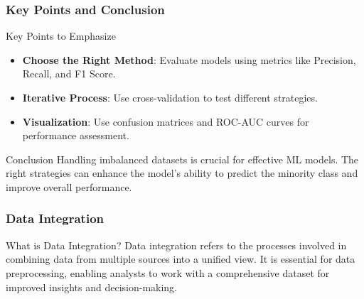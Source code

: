 \documentclass[aspectratio=169]{beamer}
\begin{document}
\begin{frame}[fragile]
    \frametitle{Key Points and Conclusion}
    \begin{block}{Key Points to Emphasize}
        \begin{itemize}
            \item \textbf{Choose the Right Method}: Evaluate models using metrics like Precision, Recall, and F1 Score.
            \item \textbf{Iterative Process}: Use cross-validation to test different strategies.
            \item \textbf{Visualization}: Use confusion matrices and ROC-AUC curves for performance assessment.
        \end{itemize}
    \end{block}
    
    \begin{block}{Conclusion}
        Handling imbalanced datasets is crucial for effective ML models. The right strategies can enhance the model's ability to predict the minority class and improve overall performance.
    \end{block}
\end{frame}

\begin{frame}[fragile]
    \frametitle{Data Integration}
    \begin{block}{What is Data Integration?}
        Data integration refers to the processes involved in combining data from multiple sources into a unified view. It is essential for data preprocessing, enabling analysts to work with a comprehensive dataset for improved insights and decision-making.
    \end{block}
\end{frame}
\end{document}
